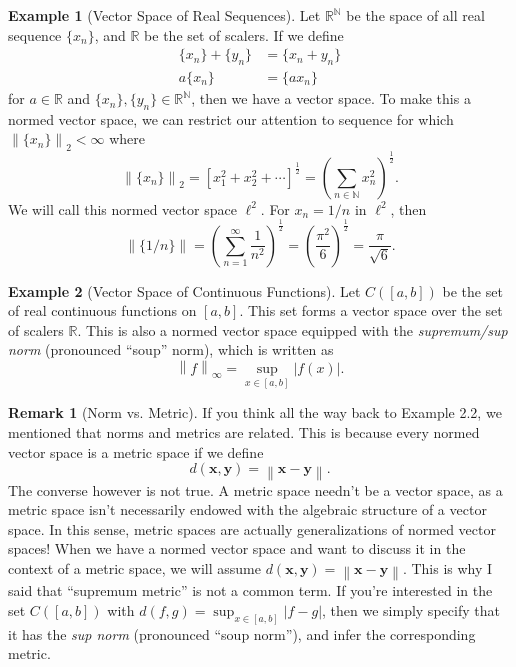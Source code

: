 \documentclass{article}
\newcommand{\N}{\mathbb{N}}
\newcommand{\R}{\mathbb{R}}
\newcommand{\x}{\mathbf{x}}
\newcommand{\y}{\mathbf{y}}
\newcommand{\norm}[1]{\left\lVert#1\right\rVert}
\theoremstyle{definition}
\newtheorem{example}{Example}[section]
\newtheorem{remark}{Remark}[section]
\begin{document}
\begin{example}[Vector Space of Real Sequences]
	Let $ \R^\N $ be the space of all real sequence $ \{x_n\} $, and $ \R $ be the set of scalers. If we define \begin{align*}
		\{x_n\}+\{y_n\}&=\{x_n+y_n\}\\
		a\{x_n\}&=\{ax_n \}
	\end{align*}
	for $ a\in\R $ and $ \{x_n\},\{y_n\}\in\R^\N $, then we have a vector space. To make this a normed vector space, we can restrict our attention to sequence for which $ \norm{\{x_n\}}_2<\infty $ where $$ \norm{\{x_n\}}_2=\left[x_1^2+x_2^2+\cdots\right]^\frac{1}{2}=\left(\sum_{n\in\N}x_n^2\right)^\frac{1}{2}.$$  We will call this normed vector space $ \ell^2 $. For $ x_n=1/n $ in $ \ell^2 $, then $$\norm{\{1/n\}}=\left(\sum_{n=1}^\infty\frac{1}{n^2}\right)^\frac{1}{2}=\left(\frac{\pi^2}{6}\right)^\frac{1}{2}=\frac{\pi}{\sqrt{6}} .$$ 
\end{example}
\begin{example}[Vector Space of Continuous Functions]
	Let $ C([a,b]) $ be the set of real continuous functions on $ [a,b] $. This set forms a vector space over the set of scalers $ \R $. This is also a normed vector space equipped with the \textit{\color{red}supremum/sup norm} (pronounced ``soup'' norm), which is written as $$\norm{f}_\infty=\sup_{x\in [a,b]}|f(x)| .$$
\end{example}
\begin{remark}[Norm vs. Metric]
If you think all the way back to Example 2.2, we mentioned that norms and metrics are related. This is because every normed vector space is a metric space if we define $$ d(\x,\y)=\norm{\x-\y}.$$ The converse however is not true. A metric space needn't be a vector space, as a metric space isn't necessarily endowed with the algebraic structure of a vector space. In this sense, metric spaces are actually generalizations of normed vector spaces! When we have a normed vector space and want to discuss it in the context of a metric space, we will assume $ d(\x,\y)=\norm{\x-\y}.$ This is why I said that ``supremum metric'' is not a common term. If you're interested in the set $ C([a,b]) $ with $ d(f,g)=\sup_{x\in [a,b]}|f-g| $, then we simply specify that it has the \textit{\color{red}sup norm} (pronounced ``soup norm''), and infer the corresponding metric. 
\end{remark}
\end{document}
